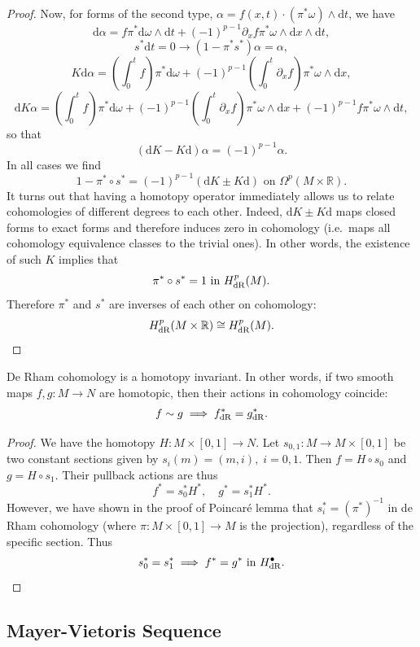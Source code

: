 \documentclass[english,letterpaper]{article}%
\numberwithin{equation}{section}
\numberwithin{figure}{section}
\numberwithin{table}{section}
\theoremstyle{definition}
\theoremstyle{definition}
\theoremstyle{definition}
\theoremstyle{plain}
\theoremstyle{plain}
\theoremstyle{plain}
\theoremstyle{plain}
\theoremstyle{remark}
\theoremstyle{remark}
\newcommand{\bbR}{\mathbb{R}}
\newcommand{\dd}{{\mathrm{d}}}
\begin{document}
\begin{proof}
    Now, for forms of the second type, $\alpha=f(x,t)\cdot(\pi^\ast\omega)\wedge\dd t$, we have
    \[\dd\alpha=f\pi^\ast\dd\omega\wedge\dd t+(-1)^{p-1}\partial_x f\pi^\ast\omega\wedge\dd x\wedge\dd t,\]
    \[s^\ast\dd t=0\rightarrow (1-\pi^\ast s^\ast)\alpha=\alpha,\]
    \[K\dd \alpha=\left(\int_0^t f\right)\pi^\ast\dd\omega+(-1)^{p-1}\left(\int_0^t\partial_x f\right)\pi^\ast\omega\wedge\dd x,\]
    \[\dd K\alpha=\left(\int_0^t f\right)\pi^\ast\dd\omega+(-1)^{p-1}\left(\int_0^t\partial_x f\right)\pi^\ast\omega\wedge\dd x+(-1)^{p-1}f\pi^\ast\omega\wedge\dd t,\]
    so that
    \[(\dd K-K \dd)\alpha=(-1)^{p-1}\alpha.\]
    In all cases we find
     \[1-\pi^\ast\circ s^\ast=(-1)^{p-1}(\dd K\pm K \dd) \text{ on }\Omega^p(M\times\bbR).\]
     It turns out that having a homotopy operator immediately allows us to relate cohomologies of different degrees to each other. Indeed, $\dd K\pm K\dd$ maps closed forms to exact forms and therefore induces zero in cohomology (i.e.\ maps all cohomology equivalence classes to the trivial ones).
     In other words, the existence of such $K$ implies that 
     \[\pi^\ast\circ s^\ast=1 \text{ in }H^p_{\rm dR}(M).\]
     Therefore $\pi^\ast$ and $s^\ast$ are inverses of each other on cohomology:
     \[H^p_{\rm dR}(M\times\bbR)\cong H^p_{\rm dR}(M).\]
\end{proof}

\begin{cor}
    De Rham cohomology is a homotopy invariant. In other words, if two smooth maps $f,g:M\to N$ are homotopic, then their actions in cohomology coincide:
    \[f\sim g\implies f^\ast_{\rm dR}=g^\ast_{\rm dR}.\]
\end{cor}
\begin{proof}
    We have the homotopy $H:M\times[0,1]\to N$. Let $s_{0,1}:M\to M\times [0,1]$ be two constant sections given by $s_i(m)=(m,i),\;i=0,1$. Then $f=H\circ s_0$ and $g=H\circ s_1$. Their pullback actions are thus
    \[f^\ast=s_0^\ast H^\ast,\quad g^\ast=s_1^\ast H^\ast.\]
    However, we have shown in the proof of Poincar\'e lemma that $s_i^\ast=(\pi^\ast)^{-1}$ in de Rham cohomology (where $\pi:M\times [0,1]\to M$ is the projection), regardless of the specific section. Thus
    \[s_0^\ast=s_1^\ast\implies f^\ast=g^\ast \text{ in }H^\bullet_{\rm dR}.\]
\end{proof}


\subsection{Mayer-Vietoris Sequence}
\end{document}
